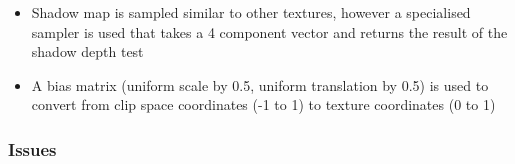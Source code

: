 \documentclass[a4paper]{article}
\begin{document}
\begin{itemize}
      \begin{itemize}
        \item
          Shadow map is sampled similar to other textures, however a specialised
          sampler is used that takes a 4 component vector and returns the result
          of the shadow depth test

        \item
          A bias matrix (uniform scale by 0.5, uniform translation by 0.5) is
          used to convert from clip space coordinates (-1 to 1) to texture
          coordinates (0 to 1)

      \end{itemize}

\end{itemize}

\subsubsection{Issues}
\end{document}
